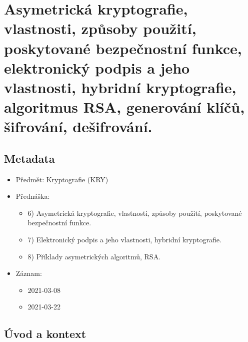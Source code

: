 

\chapter{Asymetrická kryptografie, vlastnosti, způsoby použití, poskytované bezpečnostní funkce, elektronický podpis a jeho vlastnosti, hybridní kryptografie, algoritmus RSA, generování klíčů, šifrování, dešifrování.}



\section{Metadata}

\begin{itemize}
    \item Předmět: Kryptografie (KRY)
    \item Přednáška:
    \begin{itemize}
        \item 6) Asymetrická kryptografie, vlastnosti, způsoby použití, poskytované bezpečnostní funkce.
        \item 7) Elektronický podpis a jeho vlastnosti, hybridní kryptografie.
        \item 8) Příklady asymetrických algoritmů, RSA.
    \end{itemize}
    \item Záznam:
    \begin{itemize}
        \item 2021-03-08
        \item 2021-03-22
    \end{itemize}
\end{itemize}


\section{Úvod a kontext}

